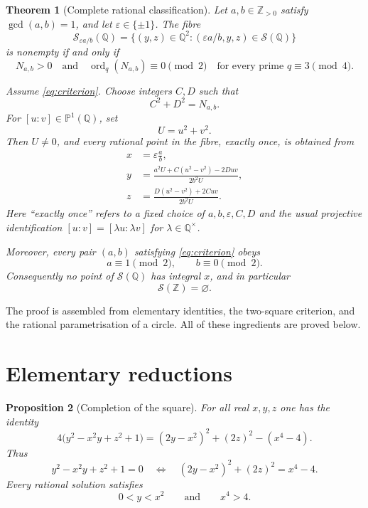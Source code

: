 \documentclass[11pt]{article}
\numberwithin{equation}{section}
\newtheorem{theorem}{Theorem}[section]
\newtheorem{proposition}[theorem]{Proposition}
\theoremstyle{definition}
\theoremstyle{remark}
\newcommand{\Q}{\mathbb{Q}}
\newcommand{\Z}{\mathbb{Z}}
\newcommand{\Pone}{\mathbb{P}^{1}}
\newcommand{\ord}{\operatorname{ord}}
\newcommand{\eps}{\varepsilon}
\begin{document}
\begin{theorem}[Complete rational classification]\label{thm:main}
Let $a,b\in\Z_{>0}$ satisfy $\gcd(a,b)=1$, and let
$\eps\in\{\pm1\}$.  The fibre
\[
 \mathcal S_{\eps a/b}(\Q)
 =\{(y,z)\in\Q^{2}:(\eps a/b,y,z)\in\mathcal S(\Q)\}
\]
is nonempty if and only if
\begin{equation}\label{eq:criterion}
 N_{a,b}>0
 \quad\text{and}\quad
 \ord_{q}(N_{a,b})\equiv0\pmod 2
 \quad\text{for every prime }q\equiv3\pmod4.
\end{equation}

Assume \eqref{eq:criterion}.  Choose integers $C,D$ such that
\begin{equation}\label{eq:CD}
 C^{2}+D^{2}=N_{a,b}.
\end{equation}
For $[u:v]\in\Pone(\Q)$, set
\[
 U=u^{2}+v^{2}.
\]
Then $U\ne0$, and every rational point in the fibre, exactly once, is
obtained from
\begin{align}
 x&=\eps\frac ab,\label{eq:param-x}\\
 y&=\frac{a^{2}U+C(u^{2}-v^{2})-2Duv}
 {2b^{2}U},\label{eq:param-y}\\
 z&=\frac{D(u^{2}-v^{2})+2Cuv}
 {2b^{2}U}.\label{eq:param-z}
\end{align}
Here ``exactly once'' refers to a fixed choice of $a,b,\eps,C,D$ and
the usual projective identification $[u:v]=[\lambda u:\lambda v]$ for
$\lambda\in\Q^{\times}$.

Moreover, every pair $(a,b)$ satisfying \eqref{eq:criterion} obeys
\begin{equation}\label{eq:parity-conclusion}
 a\equiv1\pmod2,
 \qquad
 b\equiv0\pmod2.
\end{equation}
Consequently no point of $\mathcal S(\Q)$ has integral $x$, and in
particular
\[
 \mathcal S(\Z)=\varnothing.
\]
\end{theorem}

The proof is assembled from elementary identities, the two-square
criterion, and the rational parametrisation of a circle.  All of these
ingredients are proved below.

\section{Elementary reductions}

\begin{proposition}[Completion of the square]\label{prop:completion}
For all real $x,y,z$ one has the identity
\begin{equation}\label{eq:master-identity}
4\bigl(y^{2}-x^{2}y+z^{2}+1\bigr)
=(2y-x^{2})^{2}+(2z)^{2}-(x^{4}-4).
\end{equation}
Thus
\begin{equation}\label{eq:norm-equation}
 y^{2}-x^{2}y+z^{2}+1=0
 \quad\Longleftrightarrow\quad
 (2y-x^{2})^{2}+(2z)^{2}=x^{4}-4.
\end{equation}
Every rational solution satisfies
\begin{equation}\label{eq:real-inequalities}
 0<y<x^{2}
 \qquad\text{and}\qquad
 x^{4}>4.
\end{equation}
\end{proposition}
\end{document}
